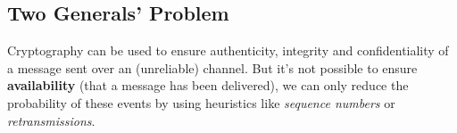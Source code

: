 \documentclass[12pt,A4]{extarticle}
\begin{document}
\subsection{Two Generals' Problem}
Cryptography can be used to ensure authenticity, integrity and confidentiality of a message sent over an (unreliable) channel. But it's not possible to ensure \textbf{availability} (that a message has been delivered), we can only reduce the probability of these events by using heuristics like \textit{sequence numbers} or \textit{retransmissions}.

\newpage


\end{document}
